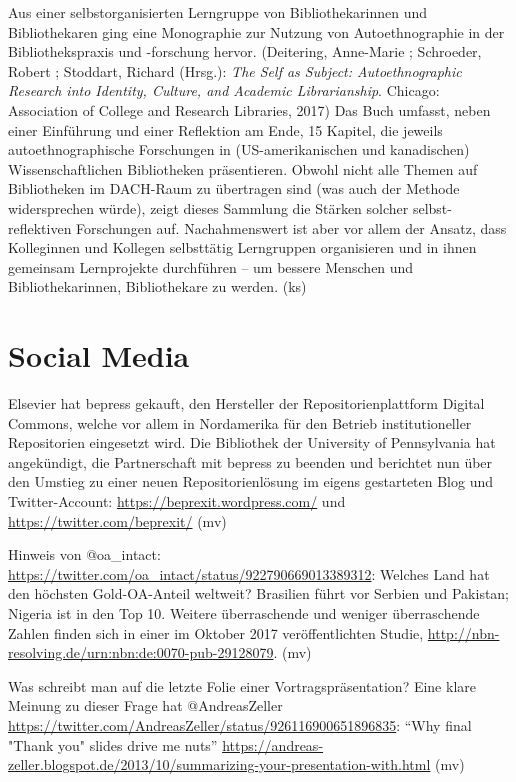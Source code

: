 \documentclass[a4paper,
fontsize=11pt,
oneside,
numbers=noperiodatend,
parskip=half-,
bibliography=totoc,
final
]{scrartcl}
\begin{document}
Aus einer selbstorganisierten Lerngruppe von Bibliothekarinnen und
Bibliothekaren ging eine Monographie zur Nutzung von Autoethnographie in
der Bibliothekspraxis und -forschung hervor. (Deitering, Anne-Marie ;
Schroeder, Robert ; Stoddart, Richard (Hrsg.): \emph{The Self as
Subject: Autoethnographic Research into Identity, Culture, and Academic
Librarianship}. Chicago: Association of College and Research Libraries,
2017) Das Buch umfasst, neben einer Einführung und einer Reflektion am
Ende, 15 Kapitel, die jeweils autoethnographische Forschungen in
(US-amerikanischen und kanadischen) Wissenschaftlichen Bibliotheken
präsentieren. Obwohl nicht alle Themen auf Bibliotheken im DACH-Raum zu
übertragen sind (was auch der Methode widersprechen würde), zeigt dieses
Sammlung die Stärken solcher selbst-reflektiven Forschungen auf.
Nachahmenswert ist aber vor allem der Ansatz, dass Kolleginnen und
Kollegen selbsttätig Lerngruppen organisieren und in ihnen gemeinsam
Lernprojekte durchführen -- um bessere Menschen und Bibliothekarinnen,
Bibliothekare zu werden. (ks)

\hypertarget{social-media}{%
\section*{Social Media}\label{social-media}}

Elsevier hat bepress gekauft, den Hersteller der Repositorienplattform
Digital Commons, welche vor allem in Nordamerika für den Betrieb
institutioneller Repositorien eingesetzt wird. Die Bibliothek der
University of Pennsylvania hat angekündigt, die Partnerschaft mit
bepress zu beenden und berichtet nun über den Umstieg zu einer neuen
Repositorienlösung im eigens gestarteten Blog und Twitter-Account:
\url{https://beprexit.wordpress.com/} und
\url{https://twitter.com/beprexit/} (mv)

Hinweis von @oa\_intact:
\url{https://twitter.com/oa_intact/status/922790669013389312}: Welches
Land hat den höchsten Gold-OA-Anteil weltweit? Brasilien führt vor
Serbien und Pakistan; Nigeria ist in den Top 10. Weitere überraschende
und weniger überraschende Zahlen finden sich in einer im Oktober 2017
veröffentlichten Studie,
\url{http://nbn-resolving.de/urn:nbn:de:0070-pub-29128079}. (mv)

Was schreibt man auf die letzte Folie einer Vortragspräsentation? Eine
klare Meinung zu dieser Frage hat @AndreasZeller
\url{https://twitter.com/AndreasZeller/status/926116900651896835}:
\enquote{Why final "Thank you" slides drive me nuts}
\url{https://andreas-zeller.blogspot.de/2013/10/summarizing-your-presentation-with.html}
(mv)
\end{document}
